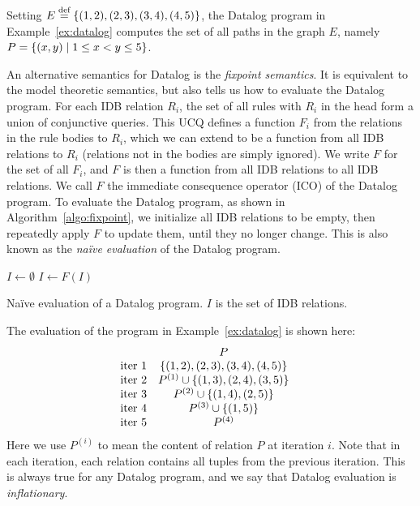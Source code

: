 \begin{ex}
\label{ex:tc}
Setting $E \stackrel{\text{def}}{=} \{(1, 2), (2, 3), (3, 4), (4, 5)\}$,
 the Datalog program in Example~\ref{ex:datalog}
 computes the set of all paths in the graph $E$, 
 namely $P = \{{(x, y)}\mid{1 \leq x < y \leq 5}\}$. 
\end{ex}

An alternative semantics for Datalog is the {\em fixpoint semantics}.
It is equivalent to the model theoretic semantics,
 but also tells us how to evaluate the Datalog program.
For each IDB relation $R_i$, the set of all rules with $R_i$ in the head 
 form a union of conjunctive queries.
This UCQ defines a function $F_i$ from the relations in the rule bodies to $R_i$,
 which we can extend to be a function from all IDB relations to $R_i$ 
 (relations not in the bodies are simply ignored). 
We write $F$ for the set of all $F_i$, 
 and $F$ is then a function from all IDB relations to all IDB relations.
We call $F$ the immediate consequence operator (ICO) of the Datalog program.
To evaluate the Datalog program, as shown in Algorithm~\ref{algo:fixpoint},
 we initialize all IDB relations to be empty,
 then repeatedly apply $F$ to update them, 
 until they no longer change.
This is also known as the {\em na\"ive evaluation} of the Datalog program.
\begin{algorithm}
$I \gets \emptyset$\;
{
    $I \gets F(I)$\;
}
\caption{Na\"ive evaluation of a Datalog program. $I$ is the set of IDB relations.}
\label{algo:fixpoint}
\end{algorithm}

\begin{ex}
\label{ex:tc-fixpoint}
The evaluation of the program in Example~\ref{ex:datalog} is shown here:
%
\begin{align*}
    &
    \begin{array}{l c } 
                       & P \\ 
        \text{iter } 1 & \{(1, 2), (2, 3), (3, 4), (4, 5)\} \\ 
        \text{iter } 2 & P^{(1)} \cup \{ (1, 3), (2, 4), (3, 5)\} \\
        \text{iter } 3 & P^{(2)} \cup \{ (1, 4), (2, 5) \} \\
        \text{iter } 4 & P^{(3)} \cup \{ (1, 5) \} \\
        \text{iter } 5 & P^{(4)} \\
    \end{array}
\end{align*}
%
Here we use $P^{(i)}$ to mean the content of relation $P$ at iteration $i$.
Note that in each iteration, each relation contains all tuples from the previous iteration.
This is always true for any Datalog program, 
 and we say that Datalog evaluation is {\em inflationary}.
\end{ex}


